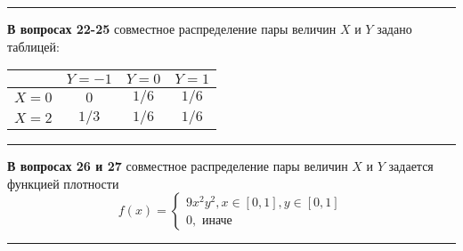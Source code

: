 




















\rule{\textwidth}{1pt}
\textbf{В вопросах 22-25} совместное распределение пары величин $X$ и $Y$ задано таблицей:

\begin{tabular}{c|ccc}
 & $Y=-1$ & $Y=0$ & $Y=1$ \\
\hline
$X=0$ & $0$ & $1/6$  &  $1/6$\\
$X=2$ & $1/3$ & $1/6$ &  $1/6$ \\
\end{tabular}


\vspace{0.2cm}

% 



\rule{\textwidth}{1pt}

\textbf{В вопросах 26 и 27} совместное распределение пары величин $X$ и $Y$ задается функцией плотности
\[
f(x) = \begin{cases}
     				9 x^2 y^2, x \in [0,1], y \in [0,1] \\
     				0,\text{ иначе}
 				\end{cases}
\]
\vspace{0.2cm}




\rule{\textwidth}{1pt}


% 










